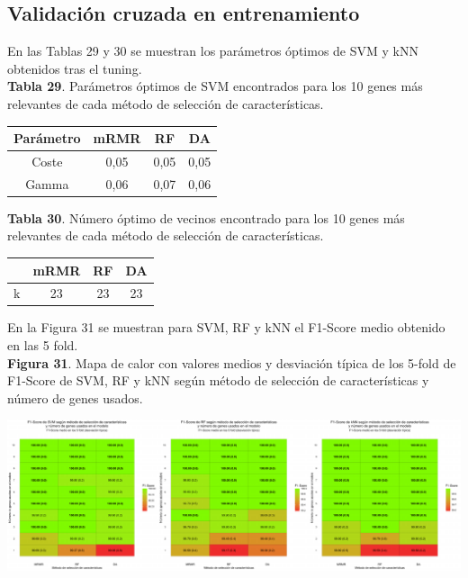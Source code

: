 \subsection{Validación cruzada en entrenamiento}

En las Tablas 29 y 30 se muestran los parámetros óptimos de SVM y kNN obtenidos tras el tuning.\\

\textbf{Tabla 29}. Parámetros óptimos de SVM encontrados para los 10 genes más relevantes de cada método de selección de características.

\begin{table}[H]
	\centering
	\begin{tabular}{cccc}
		\hline
		\textbf{Parámetro} & \textbf{mRMR} & \textbf{RF} & \textbf{DA} \\ \hline
		Coste                &    0,05 &    0,05     &  0,05       \\
		Gamma               &     0,06    &     0,07   & 0,06        \\ \hline
	\end{tabular}
\end{table}

\textbf{Tabla 30}. Número óptimo de vecinos encontrado para los 10 genes más relevantes de cada método de selección de características.

\begin{table}[H]
	\centering
	\begin{tabular}{cccc}
		\cline{2-4}
		\textbf{} & \textbf{mRMR} & \textbf{RF} & \textbf{DA} \\ \hline
		k                &   23 &   23     &   23      \\ \hline
	\end{tabular}
\end{table}

En la Figura 31 se muestran para SVM, RF y kNN el F1-Score medio obtenido en las 5 fold.\\

\textbf{Figura 31}. Mapa de calor con valores medios y desviación típica de los 5-fold de F1-Score de SVM, RF y kNN según método de selección de características y número de genes usados.
\begin{center}
	\includegraphics[width=1\textwidth]{figuras/31_cr_biclase_heatmap_horizontal.pdf} 
\end{center}

